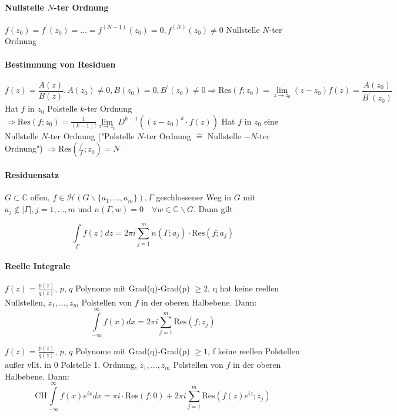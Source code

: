 \documentclass[a4paper, 10pt, DIV20, headings=small]{scrartcl}
\theoremstyle{definition}
\theoremstyle{plain}
\begin{document}
\paragraph{Nullstelle $N$-ter Ordnung}
$f(z_0) = f^\prime(z_0) = \ldots = f^{(N-1)}(z_0) = 0, f^{(N)}(z_0) \neq 0$ Nullstelle $N$-ter Ordnung

\paragraph{Bestimmung von Residuen}
$$f(z) = \frac{A(z)}{B(z)}, A(z_0) \neq 0, B(z_0) = 0, B^\prime(z_0) \neq 0 \Rightarrow \text{Res}(f;z_0) = \lim\limits_{z \to z_0} (z-z_0) f(z) = \frac{A(z_0)}{B^\prime(z_0)}$$
Hat $f$ in $z_0$ Polstelle $k$-ter Ordnung $\Rightarrow \text{Res}(f;z_0) = \frac{1}{(k-1)!} \lim\limits_{z \to z_0} D^{k-1} \left((z-z_0)^k \cdot f(z)\right)$
Hat $f$ in $z_0$ eine Nullstelle $N$-ter Ordnung ("Polstelle $N$-ter Ordnung $\hat{=}$ Nullstelle $-N$-ter Ordnung") $\Rightarrow \text{Res}\left(\frac{f^\prime}{f};z_0\right) = N$

\paragraph{Residuensatz}
$G \subset \mathbb{C}$ offen, $f \in \mathcal{H}(G \backslash \{a_1, \ldots, a_m\}), \Gamma$ geschlossener Weg in $G$ mit $a_j \notin |\Gamma|, j=1, \ldots, m$ und $n(\Gamma, w) = 0 \quad \forall w \in \mathbb{C} \backslash G$. Dann gilt

$$\int\limits_{\Gamma}{f(z) dz} = 2 \pi i \sum\limits_{j=1}^m{n(\Gamma; a_j) \cdot \text{Res}(f;a_j)}$$

\paragraph{Reelle Integrale}
$f(z) = \frac{p(z)}{q(z)}$, $p$, $q$ Polynome mit Grad(q)-Grad(p) $\geq 2$, q hat keine reellen Nullstellen,
$z_1, \ldots, z_m$ Polstellen von $f$ in der oberen Halbebene. Dann:
$$\int\limits_{-\infty}^{\infty}{f(x)dx} = 2 \pi i \sum\limits_{j=1}^m{\text{Res}(f;z_j)}$$

$f(z) = \frac{p(z)}{q(z)}$, $p$, $q$ Polynome mit Grad(q)-Grad(p) $\geq 1$, f keine reellen Polstellen außer vllt. in 0 Polstelle 1. Ordnung, $z_1, \ldots, z_m$ Polstellen von $f$ in der oberen Halbebene. Dann:
$$\text{CH} \int\limits_{-\infty}^{\infty}{f(x) e^{ix} dx} = \pi i \cdot \text{Res}(f;0) + 2 \pi i \sum\limits_{j=1}^m{\text{Res}(f(z) e^{iz};z_j)}$$
\end{document}
